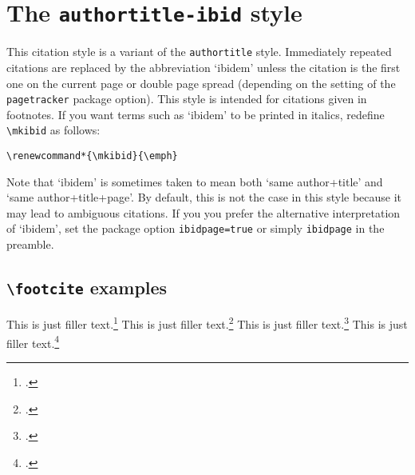 \documentclass[a4paper]{article}
\newcommand{\cmd}[1]{\texttt{\textbackslash #1}}
\begin{document}
\section*{The \texttt{authortitle-ibid} style}

This citation style is a variant of the \texttt{authortitle} style.
Immediately repeated citations are replaced by the abbreviation
`ibidem' unless the citation is the first one on the current page or
double page spread (depending on the setting of the
\texttt{pagetracker} package option). This style is intended for
citations given in footnotes. If you want terms such as `ibidem' to
be printed in italics, redefine \cmd{mkibid} as follows:

\begin{verbatim}
\renewcommand*{\mkibid}{\emph}
\end{verbatim}
%
Note that `ibidem' is sometimes taken to mean both `same
author+title' and `same author+title+page'. By default, this is not
the case in this style because it may lead to ambiguous citations.
If you you prefer the alternative interpretation of `ibidem', set
the package option \texttt{ibidpage=true} or simply
\texttt{ibidpage} in the preamble.

\subsection*{\cmd{footcite} examples}

This is just filler text.\footcite{aristotle:rhetoric}
This is just filler text.\footcite{aristotle:rhetoric}
\clearpage
This is just filler text.\footcite[55]{aristotle:rhetoric}
This is just filler text.\footcite[55]{aristotle:rhetoric}

\clearpage
\printbibliography
\end{document}
